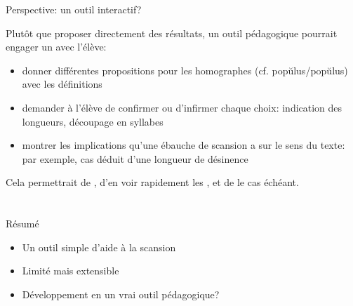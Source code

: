 \documentclass{beamer}
\newcommand\overtxt[2]{\makebox[0cm][l]{\color{diacrit}#1}#2}
\newcommand\hlbr{\overtxt{\u~}}
\newcommand\hllg{\overtxt{\=~}}
\begin{document}
\begin{frame}{Perspective: un outil interactif?}

Plutôt que proposer directement des résultats, un outil pédagogique pourrait engager un  avec l'élève:

\begin{itemize}
\item donner différentes propositions pour les homographes (cf. p\hlbr{o}p\u{u}lus/p\hllg{o}p\u{u}lus) avec les définitions

\item demander à l'élève de confirmer ou d'infirmer chaque choix: indication des longueurs, découpage en syllabes

\item montrer les implications qu'une ébauche de scansion a sur le sens du texte:\\ par exemple, cas déduit d'une longueur de désinence

\end{itemize}

\vfill

Cela permettrait de , d'en voir rapidement les , et de  le cas échéant.

\end{frame} %



\section*{}

\begin{frame}{Résumé}

\begin{itemize}
\item Un outil simple d'aide à la scansion
\item Limité mais extensible
\item Développement en un vrai outil pédagogique?
\end{itemize}

\vfill


\vfill

\end{frame} %
\end{document}
